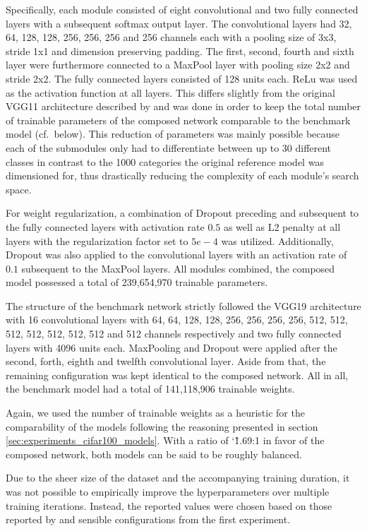 Specifically, each module consisted of eight convolutional and two fully connected layers with a subsequent softmax output layer. The convolutional layers had 32, 64, 128, 128, 256, 256, 256 and 256 channels each with a pooling size of 3x3, stride 1x1 and dimension preserving padding. The first, second, fourth and sixth layer were furthermore connected to a MaxPool layer with pooling size 2x2 and stride 2x2. The fully connected layers consisted of 128 units each. ReLu was used as the activation function at all layers. This differs slightly from the original VGG11 architecture described by \cite{Simonyan2014-bt} and was done in order to keep the total number of trainable parameters of the composed network comparable to the benchmark model (cf.\ below). This reduction of parameters was mainly possible because each of the submodules only had to differentiate between up to 30 different classes in contrast to the 1000 categories the original reference model was dimensioned for, thus drastically reducing the complexity of each module's search space.

For weight regularization, a combination of Dropout preceding and subsequent to the fully connected layers with activation rate $0.5$ as well as L2 penalty at all layers with the regularization factor set to $5e-4$ was utilized. Additionally, Dropout was also applied to the convolutional layers with an activation rate of $0.1$ subsequent to the MaxPool layers. All modules combined, the composed model possessed a total of 239,654,970 trainable parameters.

The structure of the benchmark network strictly followed the VGG19 architecture with 16 convolutional layers with 64, 64, 128, 128, 256, 256, 256, 256, 512, 512, 512, 512, 512, 512, 512 and 512 channels respectively and two fully connected layers with 4096 units each. MaxPooling and Dropout were applied after the second, forth, eighth and twelfth convolutional layer. Aside from that, the remaining configuration was kept identical to the composed network. All in all, the benchmark model had a total of 141,118,906 trainable weights.

Again, we used the number of trainable weights as a heuristic for the comparability of the models following the reasoning presented in section \ref{sec:experiments_cifar100_models}. With a ratio of \char`\~1.69:1 in favor of the composed network, both models can be said to be roughly balanced.

Due to the sheer size of the dataset and the accompanying training duration, it was not possible to empirically improve the hyperparameters over multiple training iterations. Instead, the reported values were chosen based on those reported by \cite{Simonyan2014-bt} and sensible configurations from the first experiment.

